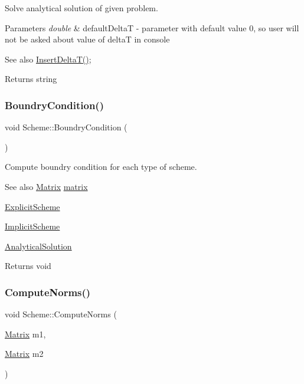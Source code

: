 Solve analytical solution of given problem. 
\begin{DoxyParams}{Parameters}
{\em double} & default\+DeltaT -\/ parameter with default value 0, so user will not be asked about value of deltaT in console \\
\hline
\end{DoxyParams}
\begin{DoxySeeAlso}{See also}
\mbox{\hyperlink{class_scheme_ac5803e4951dc125b274f543d5037c21d}{Insert\+Delta\+T()}}; 
\end{DoxySeeAlso}
\begin{DoxyReturn}{Returns}
string 
\end{DoxyReturn}
\mbox{\label{class_scheme_a36885039937c25f13c8daea654e37b97}} 
\subsubsection{\texorpdfstring{Boundry\+Condition()}{BoundryCondition()}}
{\footnotesize\ttfamily void Scheme\+::\+Boundry\+Condition (\begin{DoxyParamCaption}{ }\end{DoxyParamCaption})\hspace{0.3cm}{\ttfamily [protected]}}

Compute boundry condition for each type of scheme. \begin{DoxySeeAlso}{See also}
\mbox{\hyperlink{class_matrix}{Matrix}} \mbox{\hyperlink{class_scheme_a0e1fb8cb7e062d3f49715445a884f0e8}{matrix}} 

\mbox{\hyperlink{class_explicit_scheme}{Explicit\+Scheme}} 

\mbox{\hyperlink{class_implicit_scheme}{Implicit\+Scheme}} 

\mbox{\hyperlink{class_scheme_a7d3e9f8133a955517471eb7a6fea355f}{Analytical\+Solution}} 
\end{DoxySeeAlso}
\begin{DoxyReturn}{Returns}
void 
\end{DoxyReturn}
\mbox{\label{class_scheme_ae098876d0287ac2bf5220608db2a8468}} 
\subsubsection{\texorpdfstring{Compute\+Norms()}{ComputeNorms()}}
{\footnotesize\ttfamily void Scheme\+::\+Compute\+Norms (\begin{DoxyParamCaption}\item[{\mbox{\hyperlink{class_matrix}{Matrix}}}]{m1,  }\item[{\mbox{\hyperlink{class_matrix}{Matrix}}}]{m2 }\end{DoxyParamCaption})}

